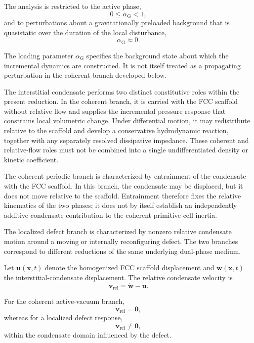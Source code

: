 The analysis is restricted to the active phase,
\begin{equation}
    0 \leq \alpha_{\mathrm{G}} < 1,
\end{equation}
and to perturbations about a gravitationally preloaded background that is quasistatic over the duration of the local disturbance,
\begin{equation}
    \dot{\alpha}_{\mathrm{G}} \approx 0.
\end{equation}

The loading parameter $\alpha_{\mathrm{G}}$ specifies the background state about which the incremental dynamics are constructed. It is not itself treated as a propagating perturbation in the coherent branch developed below.

The interstitial condensate performs two distinct constitutive roles within the present reduction. In the coherent branch, it is carried with the FCC scaffold without relative flow and supplies the incremental pressure response that constrains local volumetric change. Under differential motion, it may redistribute relative to the scaffold and develop a conservative hydrodynamic reaction, together with any separately resolved dissipative impedance. These coherent and relative-flow roles must not be combined into a single undifferentiated density or kinetic coefficient.

The coherent periodic branch is characterized by entrainment of the condensate with the FCC scaffold. In this branch, the condensate may be displaced, but it does not move relative to the scaffold. Entrainment therefore fixes the relative kinematics of the two phases; it does not by itself establish an independently additive condensate contribution to the coherent primitive-cell inertia.

The localized defect branch is characterized by nonzero relative condensate motion around a moving or internally reconfiguring defect. The two branches correspond to different reductions of the same underlying dual-phase medium.

Let $\mathbf{u}(\mathbf{x},t)$ denote the homogenized FCC scaffold displacement and $\mathbf{w}(\mathbf{x},t)$ the interstitial-condensate displacement. The relative condensate velocity is
\begin{equation}
    \mathbf{v}_{\mathrm{rel}} = \dot{\mathbf{w}} - \dot{\mathbf{u}}.
\end{equation}

For the coherent active-vacuum branch,
\begin{equation}
    \mathbf{v}_{\mathrm{rel}} = \mathbf{0},
\end{equation}
whereas for a localized defect response,
\begin{equation}
    \mathbf{v}_{\mathrm{rel}} \neq \mathbf{0},
\end{equation}
within the condensate domain influenced by the defect.

